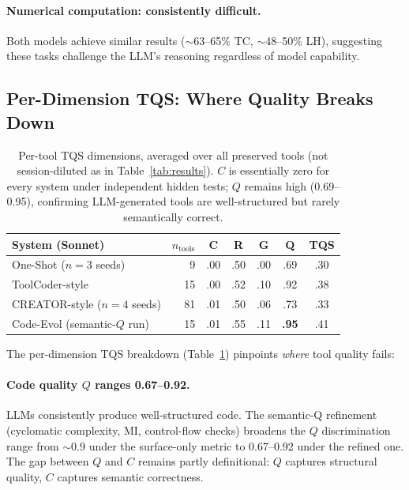 \documentclass[sigconf,anonymous,review,natbib=false]{acmart}
\begin{document}
\paragraph{Numerical computation: consistently difficult.} Both models achieve similar results ($\sim$63--65\% TC, $\sim$48--50\% LH), suggesting these tasks challenge the LLM's reasoning regardless of model capability.

\subsection{Per-Dimension TQS: Where Quality Breaks Down}
\label{sec:tqs_analysis}

\begin{table}[t]
\centering
\footnotesize
\begin{tabular}{lrcccc|c}
\toprule
\textbf{System (Sonnet)} & $n_{\text{tools}}$ & \textbf{C} & \textbf{R} & \textbf{G} & \textbf{Q} & \textbf{TQS} \\
\midrule
One-Shot ($n{=}3$ seeds)      &  9 & .00 & .50 & .00 & .69 & .30 \\
ToolCoder-style               & 15 & .00 & .52 & .10 & .92 & .38 \\
CREATOR-style ($n{=}4$ seeds) & 81 & .01 & .50 & .06 & .73 & .33 \\
Code-Evol (semantic-$Q$ run)  & 15 & .01 & .55 & .11 & \textbf{.95} & .41 \\
\bottomrule
\end{tabular}
\caption{Per-tool TQS dimensions, averaged over all preserved tools (not session-diluted as in Table~\ref{tab:results}). $C$ is essentially zero for every system under independent hidden tests; $Q$ remains high (0.69--0.95), confirming LLM-generated tools are well-structured but rarely semantically correct.}
\label{tab:tqs_dims}
\end{table}

The per-dimension TQS breakdown (Table~\ref{tab:tqs_dims}) pinpoints \emph{where} tool quality fails:

\paragraph{Code quality $Q$ ranges 0.67--0.92.} LLMs consistently produce well-structured code. The semantic-Q refinement (cyclomatic complexity, MI, control-flow checks) broadens the $Q$ discrimination range from $\sim$0.9 under the surface-only metric to 0.67--0.92 under the refined one. The gap between $Q$ and $C$ remains partly definitional: $Q$ captures structural quality, $C$ captures semantic correctness.
\end{document}
